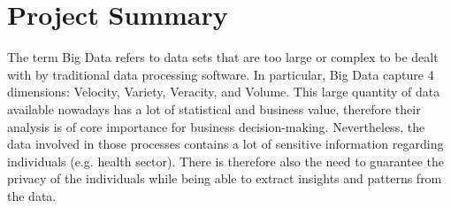 \documentclass[12pt]{article}
\begin{document}


\section{Project Summary}
The term Big Data refers to data sets that are too large or complex to be dealt with by traditional data processing software. 
In particular, Big Data capture 4 dimensions: Velocity, Variety, Veracity, and Volume. This large quantity of data available nowadays has 
a lot of statistical and business value, therefore their analysis is of core importance for business decision-making. Nevertheless, the data 
involved in those processes contains a lot of sensitive information regarding individuals (e.g. health sector). There is therefore also the need to 
guarantee the privacy of the individuals while being able to extract insights and patterns from the data. 
\end{document}
